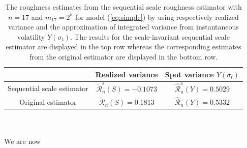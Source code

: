 \documentclass{article}
\begin{document}
\begin{table}[htbp]
    \centering
    \begin{tabular}{ccc}
        \toprule
         & Realized variance & Spot variance $Y(\sigma_t)$ \\
        \midrule
        Sequential scale estimator & $\widetilde{\mathscr{R}}_n^s (S) = -0.1073 $ & $\widehat{\mathscr{R}}_n^s (Y) = 0.5029$ \\
        Original estimator &$\widetilde{\mathscr{R}}_n (S) = 0.1813 $ & $\widehat{\mathscr{R}}_n (Y) = 0.5332$ \\
        \bottomrule
    \end{tabular}
    \caption{The roughness estimates from the sequential scale roughness estimator with $n=17$ and $m_{17}=2^5$ for model (\ref{eq:simple}) by using respectively realized variance and the approximation of integrated variance from instantaneous volatility $Y(\sigma_t)$. The results for the scale-invariant sequential scale estimator are displayed in the top row whereas the corresponding estimates from the original estimator are displayed in the bottom row.}
    \label{tab:ex5scaleest}
\end{table}\\\\
We are now 
\end{document}
